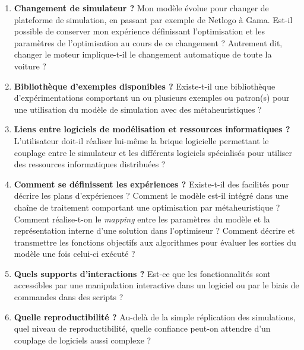 
\begin{enumerate}

	\item{\textbf{Changement de simulateur ?}} Mon modèle évolue pour changer de plateforme de simulation, en passant par exemple de Netlogo à Gama. Est-il possible de conserver mon expérience définissant l'optimisation et les paramètres de l'optimisation au cours de ce changement ? Autrement dit, changer le moteur implique-t-il le changement automatique de toute la voiture ?

	\item{\textbf{Bibliothèque d'exemples disponibles ?}} Existe-t-il une bibliothèque d'expérimentations comportant un ou plusieurs exemples ou patron(s) pour une utilisation du modèle de simulation avec des métaheuristiques ?

	\item{\textbf{Liens entre logiciels de modélisation et ressources informatiques ?}} L'utilisateur doit-il réaliser lui-même la brique logicielle permettant le couplage entre le simulateur et les différents logiciels spécialisés pour utiliser des ressources informatiques distribuées ?

	\item{\textbf{Comment se définissent les expériences ?}} Existe-t-il des facilités pour décrire les plans d'expériences ? Comment le modèle est-il intégré dans une chaîne de traitement comportant une optimisation par métaheuristique ? Comment réalise-t-on le \textit{mapping} entre les paramètres du modèle et la représentation interne d'une solution dans l'optimiseur ? Comment décrire et transmettre les fonctions objectifs aux algorithmes pour évaluer les sorties du modèle une fois celui-ci exécuté ?

	\item{\textbf{Quels supports d'interactions ?}} Est-ce que les fonctionnalités sont accessibles par une manipulation interactive dans un logiciel ou par le biais de commandes dans des scripts ?

	\item{\textbf{Quelle reproductibilité ?}} Au-delà de la simple réplication des simulations, quel niveau de reproductibilité, quelle confiance peut-on attendre d'un couplage de logiciels aussi complexe ?

\end{enumerate}


